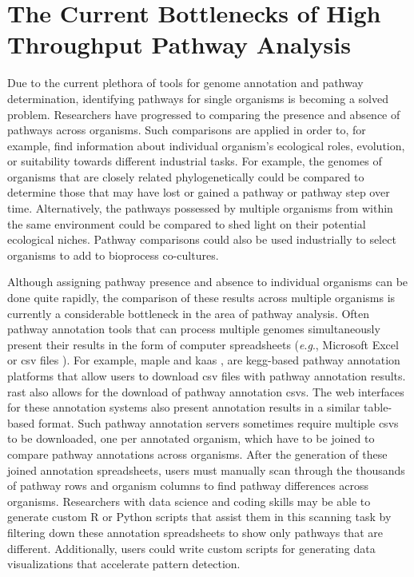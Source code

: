 \section{The Current Bottlenecks of High Throughput Pathway Analysis}

Due to the current plethora of tools for genome annotation and pathway 
determination, identifying pathways for single organisms is becoming a solved 
problem. Researchers have progressed to comparing the presence and absence of 
pathways across organisms. Such comparisons are applied in order to, for 
example, find information about individual organism's ecological roles, 
evolution, or suitability towards different industrial tasks. For example, the 
genomes of organisms that are closely related phylogenetically could be compared 
to determine those that may have lost or gained a pathway or pathway step over 
time. Alternatively, the pathways possessed by multiple organisms from within 
the same environment could be compared to shed light on their potential 
ecological niches. Pathway comparisons could also 
be used industrially to select organisms to add to bioprocess co-cultures.

Although assigning pathway presence and absence to individual organisms can be 
done quite rapidly, the comparison of these results across multiple organisms is 
currently a considerable bottleneck in the area of pathway analysis. Often 
pathway annotation tools that can process multiple genomes simultaneously 
present their results in the form of computer spreadsheets 
(\textit{e}.\textit{g}., Microsoft Excel or \gls{csv} files \cite{RFC4180}). For 
example, \gls{maple} \cite{takami2016automated} and \gls{kaas} 
\cite{moriya2007kaas}, are \gls{kegg}-based pathway annotation platforms that 
allow users to download \gls{csv} files with pathway annotation results. 
\gls{rast} also allows for the download of pathway annotation \gls{csv}s. The 
web interfaces for these annotation systems also present annotation results in a 
similar table-based format. Such pathway annotation servers sometimes require 
multiple \gls{csv}s to be downloaded, one per annotated organism, which have to 
be joined to compare pathway annotations across organisms. After the generation 
of these joined annotation spreadsheets, users must manually scan through the 
thousands of pathway rows and organism columns to find pathway differences 
across organisms. Researchers with data science and coding skills may be able to 
generate custom R \cite{rprogman} or Python \cite{van1995python} scripts that 
assist them in this scanning task by filtering down these annotation 
spreadsheets to show only pathways that are different. Additionally, users could 
write custom scripts for generating data visualizations that accelerate pattern 
detection.

